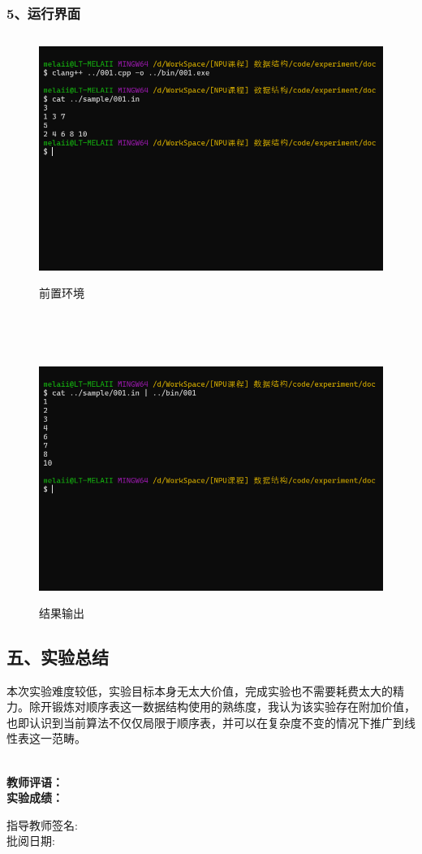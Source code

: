 \documentclass[UTF8, a4paper]{ctexart}
\begin{document}
\subsubsection*{5、运行界面}
\begin{figure}[H]
	\begin{minipage}[t]{\linewidth}
		\centering
		\includegraphics[width=125mm,height=80mm]{./assets/DS01-1}
		\caption{前置环境}
	\end{minipage}
\end{figure}
~\\~\\
\begin{figure}[H]
	\begin{minipage}[t]{\linewidth}
		\centering
		\includegraphics[width=125mm,height=80mm]{./assets/DS01-2}
		\caption{结果输出}
	\end{minipage}
\end{figure}

\subsection*{五、实验总结}
本次实验难度较低，实验目标本身无太大价值，完成实验也不需要耗费太大的精力。除开锻炼对顺序表这一数据结构使用的熟练度，我认为该实验存在附加价值，也即认识到当前算法不仅仅局限于顺序表，并可以在复杂度不变的情况下推广到线性表这一范畴。

~\\
\textbf{教师评语：}
~\\
\textbf{实验成绩：}

\begin{flushright}
\mbox{指导教师签名:\qquad\qquad} \\
\mbox{批阅日期:\qquad\qquad}
\end{flushright}
\end{document}
